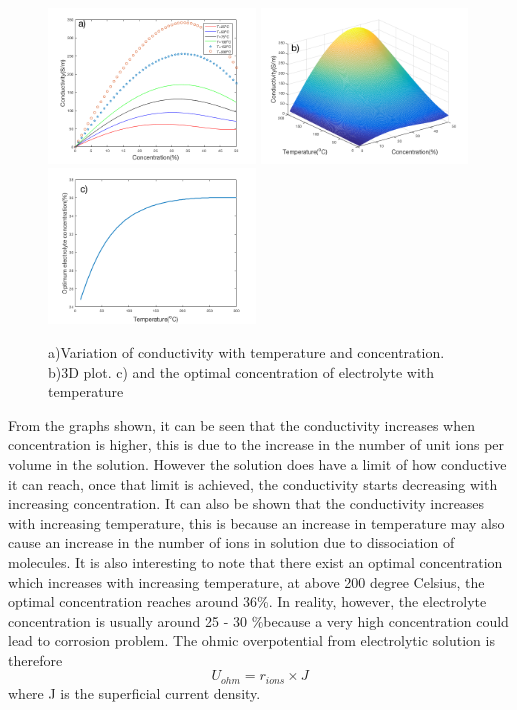 \begin{figure}[h] 
\includegraphics[width=5.5cm] {cond} 
\includegraphics[width=5.5cm]{3D}
\includegraphics[width = 5.5cm]{optimum}
\caption{ a)Variation of conductivity with temperature and concentration. b)3D plot. c) and the optimal concentration of electrolyte with temperature} 
\end{figure} 
From the graphs shown, it can be seen that the conductivity increases when concentration is higher, this is due to the increase in the number of unit ions per volume in the solution. However the solution does have a limit of how conductive it can reach, once that limit is achieved, the conductivity starts decreasing with increasing concentration. It can also be shown that the conductivity increases with increasing temperature, this is because an increase in temperature may also cause an increase in the number of ions in solution due to dissociation of molecules. It is also interesting to note that there exist an optimal concentration which increases with increasing temperature, at above 200 degree Celsius, the optimal concentration reaches around 36\%. In reality, however, the electrolyte concentration is usually around 25 - 30 \%because a very high concentration could lead to corrosion problem.
The ohmic overpotential from electrolytic solution is therefore\
\begin{equation} 
U_{ohm} = r_{ions} \times J
\end{equation} 
where J is the superficial current density. 


